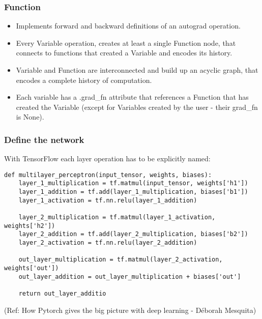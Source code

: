 \begin{frame}[fragile] \frametitle{Function}
\begin{itemize}
\item Implements forward and backward definitions of an autograd operation. 
\item Every Variable operation, creates at least a single Function node, that connects to functions that created a Variable and encodes its history.
\item Variable and Function are interconnected and build up an acyclic graph, that encodes a complete history of computation.
\item Each variable has a .grad\_fn attribute that references a Function that has created the Variable (except for Variables created by the user - their grad\_fn is None).
\end{itemize}
\end{frame}



\begin{frame}[fragile] \frametitle{Define the network}
 With TensorFlow each layer operation has to be explicitly named:

 \begin{lstlisting}
def multilayer_perceptron(input_tensor, weights, biases):
    layer_1_multiplication = tf.matmul(input_tensor, weights['h1'])
    layer_1_addition = tf.add(layer_1_multiplication, biases['b1'])
    layer_1_activation = tf.nn.relu(layer_1_addition)
    
    layer_2_multiplication = tf.matmul(layer_1_activation, weights['h2'])
    layer_2_addition = tf.add(layer_2_multiplication, biases['b2'])
    layer_2_activation = tf.nn.relu(layer_2_addition)
    
    out_layer_multiplication = tf.matmul(layer_2_activation, weights['out'])
    out_layer_addition = out_layer_multiplication + biases['out']
    
    return out_layer_additio
\end{lstlisting}

  {\tiny (Ref: How Pytorch gives the big picture with deep learning - Déborah Mesquita)}
\end{frame}

